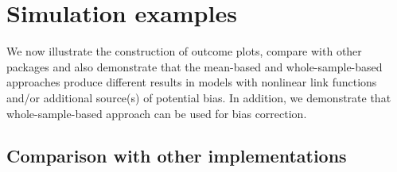 \section{Simulation examples}

We now illustrate the construction of outcome plots, compare with other packages and also demonstrate that the mean-based and whole-sample-based approaches produce different results in models with nonlinear link functions and/or additional source(s) of potential bias. In addition, we demonstrate that whole-sample-based approach can be used for bias correction.

\subsection{Comparison with other implementations}


